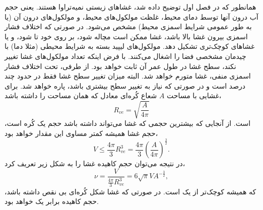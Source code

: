 همانطور که در فصل اول توضیح داده شد، غشاهای زیستی نمیه‌تراوا هستند. یعنی حجم آب درون آنها توسط دمای محیط، غلظت مولکول‌های محیط، و مولکول‌های درون آن (یا به طور عمومی شرایط اسمزی محیط) مشخص می‌شود. در صورتی که اختلاف فشار اسمزی  بیرون غشا بالا باشد، غشا ممکن است مچاله شود، بر روی خود تا شود، و یا غشا‌های کوچک‌تری تشکیل دهد. مولکول‌های لیپید بسته به شرایط محیطی (مثلا دما) با چیدمان مشخصی فضا را اشغال می‌کنند. با فرض اینکه تعداد مولکول‌های غشا تغییر نکند، سطح غشا در طول عمر آن ثابت خواهد بود. از طرفی، تحت اختلاف فشار اسمزی منفی، غشا متورم خواهد شد. البته میزان تغییر سطح غشا فقط در حدود چند درصد است و در صورتی که نیاز به تغییر سطح بیشتری باشد، پاره خواهد شد. برای غشایی با مساحت
$A$
شعاع کُره‌ای معادل که همان مساحت را داشته باشد،
\begin{equation}
R_{ve}=\sqrt{\frac{A}{4\pi}}
\end{equation}
است. از آنجایی که بیشترین حجمی که غشا می‌تواند داشته باشد حجم یک کُره‌ است، حجم غشا همیشه کمتر مساوی این مقدار خواهد بود،
\begin{equation}
V\leq\frac{4\pi}{3}R_{ve}^3=\frac{4\pi}{3}\left(\frac{A}{4\pi}\right)^{\frac{3}{2}}.
\end{equation}
در نتیجه می‌توان حجم کاهیده غشا را به شکل زیر تعریف کرد،
\begin{equation}
\nu=\frac{V}{\frac{4\pi}{3}R_{ve}^3}=6\sqrt{\pi}VA^{-\frac{3}{2}},
\label{eq:reducedVolume}
\end{equation}
که همیشه کوچک‌تر از یک است. در صورتی که غشا شکل کُره‌ای بی نقص داشته باشد، حجم کاهیده برابر یک خواهد بود.
